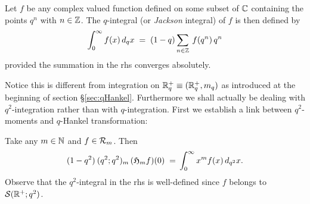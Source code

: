 \begin{defn}
Let $f$ be any complex valued function defined on some subset of
$\mathbb{C}$ containing the points $q^{n}$ with $n\in \mathbb{Z}$.
The $q$-integral (or {\em Jackson\/} integral) of $f$ is then defined by
$$ \int_0^\infty f(x)\, d_q x  \;=\;  (1-q) \sum_{n\in \mathbb{Z}} \: f(q^{n}) \, q^{n} $$
provided the summation in the {\sc rhs} converges absolutely.
\end{defn}

Notice this is different from integration on $\mathbb{R}_q^+ \equiv (\mathbb{R}_q^+,m_q)$
as introduced at the beginning of section \S \ref{sec:qHankel}\@.
Furthermore we shall actually be dealing with $q^2$-integration rather
than with $q$-integration. First we establish a link between
$q^2$-moments and $q$-Hankel transformation:

\begin{prop} \label{prop:moment:link_with_Hankel}
Take any $m\in \mathbb{N}$ and $f\in{\mathcal R}_{m}$. Then
$$ (1-q^2)\:(q^2;q^2)_m \, (\mathfrak{H}_{m}f)(0) \;=\, \int_0^\infty x^m f(x)\, d_{q^2}x.  $$
Observe that the $q^2$-integral in the {\sc rhs} is well-defined
since $f$ belongs to ${\mathcal S}(\mathbb{R}^+;q^2)$.
\end{prop}
